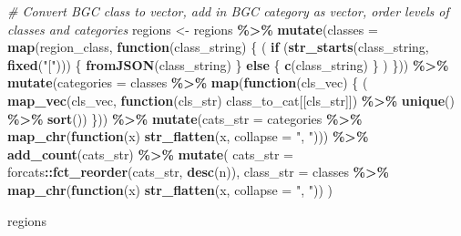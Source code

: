 \documentclass[
]{article}
\newenvironment{Shaded}{\begin{snugshade}}{\end{snugshade}}
\newcommand{\AttributeTok}[1]{\textcolor[rgb]{0.13,0.29,0.53}{#1}}
\newcommand{\CommentTok}[1]{\textcolor[rgb]{0.56,0.35,0.01}{\textit{#1}}}
\newcommand{\ControlFlowTok}[1]{\textcolor[rgb]{0.13,0.29,0.53}{\textbf{#1}}}
\newcommand{\FunctionTok}[1]{\textcolor[rgb]{0.13,0.29,0.53}{\textbf{#1}}}
\newcommand{\NormalTok}[1]{#1}
\newcommand{\OtherTok}[1]{\textcolor[rgb]{0.56,0.35,0.01}{#1}}
\newcommand{\SpecialCharTok}[1]{\textcolor[rgb]{0.81,0.36,0.00}{\textbf{#1}}}
\newcommand{\StringTok}[1]{\textcolor[rgb]{0.31,0.60,0.02}{#1}}
\begin{document}
\begin{Shaded}
\begin{Highlighting}[]
\CommentTok{\# Convert BGC \textquotesingle{}class\textquotesingle{} to vector, add in BGC \textquotesingle{}category\textquotesingle{} as vector, order levels of classes and categories}
\NormalTok{regions }\OtherTok{\textless{}{-}}\NormalTok{ regions }\SpecialCharTok{\%\textgreater{}\%}
  \FunctionTok{mutate}\NormalTok{(}\AttributeTok{classes =} \FunctionTok{map}\NormalTok{(region\_class, }\ControlFlowTok{function}\NormalTok{(class\_string) \{}
\NormalTok{    (}
      \ControlFlowTok{if}\NormalTok{ (}\FunctionTok{str\_starts}\NormalTok{(class\_string, }\FunctionTok{fixed}\NormalTok{(}\StringTok{"["}\NormalTok{))) \{}
        \FunctionTok{fromJSON}\NormalTok{(class\_string)}
\NormalTok{      \} }\ControlFlowTok{else}\NormalTok{ \{}
        \FunctionTok{c}\NormalTok{(class\_string)}
\NormalTok{      \}}
\NormalTok{    )}
\NormalTok{  \})) }\SpecialCharTok{\%\textgreater{}\%}
  \FunctionTok{mutate}\NormalTok{(}\AttributeTok{categories =}\NormalTok{ classes }\SpecialCharTok{\%\textgreater{}\%} \FunctionTok{map}\NormalTok{(}\ControlFlowTok{function}\NormalTok{(cls\_vec) \{}
\NormalTok{    (}
      \FunctionTok{map\_vec}\NormalTok{(cls\_vec, }\ControlFlowTok{function}\NormalTok{(cls\_str) class\_to\_cat[[cls\_str]]) }\SpecialCharTok{\%\textgreater{}\%} \FunctionTok{unique}\NormalTok{() }\SpecialCharTok{\%\textgreater{}\%} \FunctionTok{sort}\NormalTok{())}
\NormalTok{  \})) }\SpecialCharTok{\%\textgreater{}\%}
  \FunctionTok{mutate}\NormalTok{(}\AttributeTok{cats\_str =}\NormalTok{ categories }\SpecialCharTok{\%\textgreater{}\%} \FunctionTok{map\_chr}\NormalTok{(}\ControlFlowTok{function}\NormalTok{(x) }\FunctionTok{str\_flatten}\NormalTok{(x, }\AttributeTok{collapse =} \StringTok{", "}\NormalTok{))) }\SpecialCharTok{\%\textgreater{}\%}
  \FunctionTok{add\_count}\NormalTok{(cats\_str) }\SpecialCharTok{\%\textgreater{}\%}
  \FunctionTok{mutate}\NormalTok{(}
    \AttributeTok{cats\_str =}\NormalTok{ forcats}\SpecialCharTok{::}\FunctionTok{fct\_reorder}\NormalTok{(cats\_str, }\FunctionTok{desc}\NormalTok{(n)),}
    \AttributeTok{class\_str =}\NormalTok{ classes }\SpecialCharTok{\%\textgreater{}\%} \FunctionTok{map\_chr}\NormalTok{(}\ControlFlowTok{function}\NormalTok{(x) }\FunctionTok{str\_flatten}\NormalTok{(x, }\AttributeTok{collapse =} \StringTok{", "}\NormalTok{))}
\NormalTok{  )}

\NormalTok{regions}
\end{Highlighting}
\end{Shaded}
\end{document}

